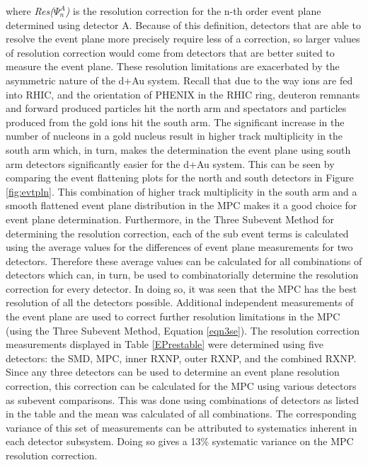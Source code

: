 where \textit{Res($\Psi_n^A$)} is the resolution correction for the n-th order event plane determined using detector A. Because of this definition, detectors that are able to resolve the event plane more precisely require less of a correction, so larger values of resolution correction would come from detectors that are better suited to measure the event plane. These resolution limitations are exacerbated by the asymmetric nature of the d+Au system. Recall that due to the way ions are fed into RHIC, and the orientation of PHENIX in the RHIC ring, deuteron remnants and forward produced particles hit the north arm and spectators and particles produced from the gold ions hit the south arm. The significant increase in the number of nucleons in a gold nucleus result in higher track multiplicity in the south arm which, in turn, makes the determination the event plane using south arm detectors significantly easier for the d+Au system. This can be seen by comparing the event flattening plots for the north and south detectors in Figure \ref{fig:evtpln}. This combination of higher track multiplicity in the south arm and a smooth flattened event plane distribution in the MPC makes it a good choice for event plane determination. Furthermore, in the Three Subevent Method for determining the resolution correction, each of the sub event terms is calculated using the average values for the differences of event plane measurements for two detectors. Therefore these average values can be calculated for all combinations of detectors which can, in turn, be used to combinatorially determine the resolution correction for every detector. In doing so, it was seen that the MPC has the best resolution of all the detectors possible. Additional independent measurements of the event plane are used to correct further resolution limitations in the MPC (using the Three Subevent Method, Equation \ref{eqn3se}). The resolution correction measurements displayed in Table \ref{EPrestable} were determined using five detectors: the SMD, MPC, inner RXNP, outer RXNP, and the combined RXNP. Since any three detectors can be used to determine an event plane resolution correction, this correction can be calculated for the MPC using various detectors as subevent comparisons. This was done using combinations of detectors as listed in the table and the mean was calculated of all combinations. The corresponding variance of this set of measurements can be attributed to systematics inherent in each detector subsystem. Doing so gives a 13\% systematic variance on the MPC resolution correction.

